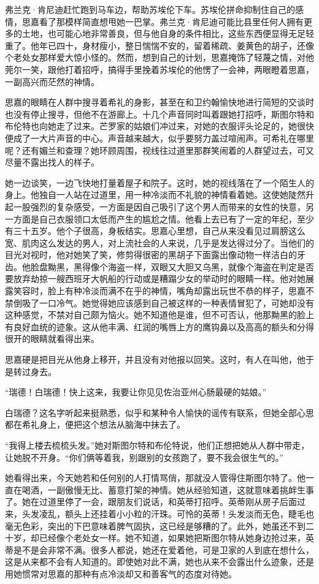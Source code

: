 \par 弗兰克·肯尼迪赶忙跑到马车边，帮助苏埃伦下车。苏埃伦拼命抑制住自己的感情，思嘉看了那模样简直想甩她一巴掌。弗兰克·肯尼迪可能比县里任何人拥有更多的土地，也可能心地非常善良，但与他自身的条件相比，这些东西便显得无足轻重了。他年已四十，身材瘦小，整日惴惴不安的，留着稀疏、姜黄色的胡子，还像个老处女那样爱大惊小怪的。然而，想到自己的计划，思嘉掩饰了轻蔑之情，对他莞尔一笑，跟他打着招呼，搞得手里挽着苏埃伦的他愣了一会神，两眼瞪着思嘉，一副高兴而茫然的神情。
\par 思嘉的眼睛在人群中搜寻着希礼的身影，甚至在和卫约翰愉快地进行简短的交谈时也没有停止搜寻，但他不在游廊上。十几个声音同时叫着跟她打招呼，斯图尔特和布伦特也向她走了过来。芒罗家的姑娘们冲过来，对她的衣服评头论足的，她很快便成了一大片声音的中心。声音越来越大，似乎要努力盖过喧闹声。可希礼在哪里呢？还有媚兰和查理？她环顾周围，视线往过道里那群笑闹着的人群望过去，可又尽量不露出找人的样子。
\par 她一边谈笑，一边飞快地打量着屋子和院子。这时，她的视线落在了一个陌生人的身上。他独自一人站在过道里，用一种冷淡而不礼貌的神情看着她。这使她陡然升起一股强烈的复杂感受，一方面是因自己吸引了这个男人而带来的女性的快意，另一方面是自己衣服领口太低而产生的尴尬之情。他看上去已有了一定的年纪，至少有三十五岁。他个子很高，身板结实。思嘉心里想，自己从来没看见过肩膀这么宽、肌肉这么发达的男人，对上流社会的人来说，几乎是发达得过分了。当他们的目光对视时，他对她笑了笑，修剪得很密的黑胡子下面露出像动物一样洁白的牙齿。他脸盘黝黑，黑得像个海盗一样，双眼又大胆又乌黑，就像个海盗在判定是否要放弃劫掠一艘西班牙大帆船的行动或是糟蹋少女的举动时的眼睛一样。他对她展露笑容时，脸上有种冷淡而满不在乎的神情，嘴角却露出玩世不恭的样子，思嘉不禁倒吸了一口冷气。她觉得她应该感到自己被这样的一种表情冒犯了，可她却没有这种感觉，不禁对自己颇为恼火。她不知道他是谁，但不可否认，他那黝黑的脸上有良好血统的迹象。这从他丰满、红润的嘴唇上方的鹰钩鼻以及高高的额头和分得很开的眼睛就看得出来。
\par 思嘉硬是把目光从他身上移开，并且没有对他报以回笑。这时，有人在叫他，他于是转过身去。
\par “瑞德！白瑞德！快上这来，我要让你见见佐治亚州心肠最硬的姑娘。”
\par 白瑞德？这名字听起来挺熟悉，似乎和某种令人愉快的谣传有联系，但她全部心思都在希礼身上，便把这个想法从脑海中抹去了。
\par “我得上楼去梳梳头发。”她对斯图尔特和布伦特说，他们正想把她从人群中带走，让她脱不开身。“你们俩等着我，别跟别的女孩跑了，要不我会很生气的。”
\par 她看得出来，今天她若和任何别的人打情骂俏，那就没人管得住斯图尔特了。他一直在喝酒，一副傲慢无比、蓄意打架的神情。她从经验知道，这就意味着挑衅生事了。她在过道里停了一会，跟朋友们说话，和英蒂打招呼。英蒂刚从房子后面过来，头发凌乱，额头上还挂着小小粒的汗珠。可怜的英蒂！头发淡而无色，睫毛也毫无色彩，突出的下巴意味着脾气固执，这已经是够糟的了。此外，她虽还不到二十岁，却已经像个老处女一样。她不知道，如果她把斯图尔特从她身边抢过来，英蒂是不是会非常不满。很多人都说，她还在爱着他，可是卫家的人到底在想什么，这是从来都不会有人知道的。即使她对此不满，她也从来不会露出什么迹象，还是用她惯常对思嘉的那种有点冷淡却又和善客气的态度对待她。
